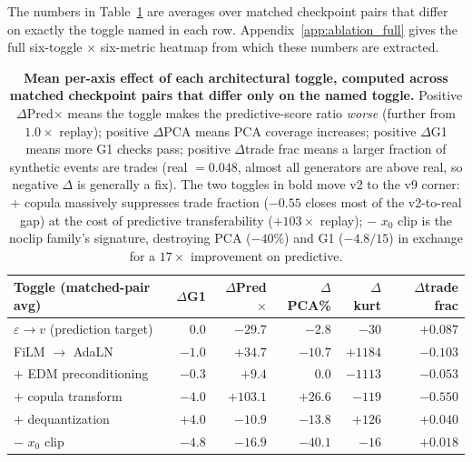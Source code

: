 \documentclass[journal]{IEEEtran}
\newcommand{\eps}{\varepsilon}
\theoremstyle{definition}   %
\begin{document}
The numbers in Table~\ref{tab:ablation_walks} are averages over
matched checkpoint pairs that differ on exactly the toggle named in
each row. Appendix~\ref{app:ablation_full} gives the full six-toggle
$\times$ six-metric heatmap from which these numbers are extracted.

\begin{table}[ht]
    \centering
    \footnotesize
    \begin{tabular}{lrrrrr}
        \toprule
        Toggle (matched-pair avg) & $\Delta$G1 & $\Delta$Pred$\times$ & $\Delta$PCA\% & $\Delta$kurt & $\Delta$trade frac \\
        \midrule
        $\eps \to v$ (prediction target)             & $\phantom{-}0.0$ & $-29.7$ & $-2.8$   & $-30$     & $+0.087$ \\
        FiLM $\to$ AdaLN              & $-1.0$           & $+34.7$ & $-10.7$  & $+1184$   & $-0.103$ \\
        $+$ EDM preconditioning                      & $-0.3$           & $+9.4$  & $\phantom{-}0.0$ & $-1113$   & $-0.053$ \\
        $+$ copula transform                         & $-4.0$           & $+103.1$& $+26.6$  & $-119$    & $\mathbf{-0.550}$ \\
        $+$ dequantization        & $+4.0$           & $-10.9$ & $-13.8$  & $+126$    & $+0.040$ \\
        $-$ $x_0$ clip                               & $-4.8$           & $-16.9$ & $\mathbf{-40.1}$ & $-16$     & $+0.018$ \\
        \bottomrule
    \end{tabular}
    \caption{\textbf{Mean per-axis effect of each architectural
    toggle, computed across matched checkpoint pairs that differ only
    on the named toggle.} Positive $\Delta$Pred$\times$ means the
    toggle makes the predictive-score ratio \emph{worse} (further
    from $1.0\times$ replay); positive $\Delta$PCA means PCA coverage
    increases; positive $\Delta$G1 means more G1 checks pass; positive
    $\Delta$trade frac means a larger fraction of synthetic events are
    trades (real $= 0.048$, almost all generators are above real, so
    negative $\Delta$ is generally a fix). The two toggles in bold
    move v2 to the v9 corner: $+$ copula massively suppresses trade
    fraction ($-0.55$ closes most of the v2-to-real gap) at the cost
    of predictive transferability ($+103\times$ replay); $-$ $x_0$
    clip is the noclip family's signature, destroying PCA ($-40\%$)
    and G1 ($-4.8/15$) in exchange for a $17\times$ improvement on
    predictive.}
    \label{tab:ablation_walks}
\end{table}
\end{document}
